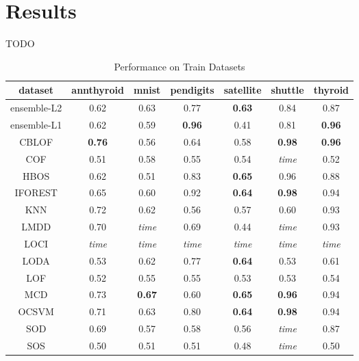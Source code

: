 \section{Results}
\label{sec:results}

TODO

\begin{table*}[!t]
\renewcommand{\arraystretch}{1.25}
\caption{Performance on Train Datasets}
\label{results:train-performance}
\centering
\begin{tabular}{|c|c|c|c|c|c|c|}
\hline
\textbf{dataset} & \textbf{annthyroid} & \textbf{mnist} & \textbf{pendigits} & \textbf{satellite} & \textbf{shuttle} & \textbf{thyroid} \\
\hline
ensemble-L2 & 0.62 & 0.63 & 0.77 & \bfseries 0.63 & 0.84 & 0.87 \\
\hline
ensemble-L1 & 0.62 & 0.59 & \bfseries 0.96 & 0.41 & 0.81 & \bfseries 0.96 \\
\hline
CBLOF & \bfseries 0.76 & 0.56 & 0.64 & 0.58 & \bfseries 0.98 & \bfseries 0.96 \\
\hline
COF & 0.51 & 0.58 & 0.55 & 0.54 & \textit{time} & 0.52 \\
\hline
HBOS & 0.62 & 0.51 & 0.83 & \bfseries 0.65 & 0.96 & 0.88 \\
\hline
IFOREST & 0.65 & 0.60 & 0.92 & \bfseries 0.64 & \bfseries 0.98 & 0.94 \\
\hline
KNN & 0.72 & 0.62 & 0.56 & 0.57 & 0.60 & 0.93 \\
\hline
LMDD & 0.70 & \textit{time} & 0.69 & 0.44 & \textit{time} & 0.93 \\
\hline
LOCI & \textit{time} & \textit{time} & \textit{time} & \textit{time} & \textit{time} & \textit{time} \\
\hline
LODA & 0.53 & 0.62 & 0.77 & \bfseries 0.64 & 0.53 & 0.61 \\
\hline
LOF & 0.52 & 0.55 & 0.55 & 0.53 & 0.53 & 0.54 \\
\hline
MCD & 0.73 & \bfseries 0.67 & 0.60 & \bfseries 0.65 & \bfseries 0.96 & 0.94 \\
\hline
OCSVM & 0.71 & 0.63 & 0.80 & \bfseries 0.64 & \bfseries 0.98 & 0.94 \\
\hline
SOD & 0.69 & 0.57 & 0.58 & 0.56 & \textit{time} & 0.87 \\
\hline
SOS & 0.50 & 0.51 & 0.51 & 0.48 & \textit{time} & 0.50 \\
\hline
\end{tabular}
\end{table*}


